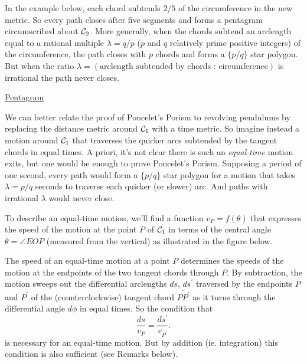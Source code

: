 \documentclass{ximera}
\begin{document}
In the example below, each chord subtends $2/5$ of the circumference in the new metric. So every path closes after five segments and forms a pentagram circumscribed about ${\cal C}_2$. More generally, when the chords subtend an arclength equal to a rational multiple $\lambda = q/p$ ($p$ and $q$ relatively prime positive integers) of the circumference, the path closes with $p$ chords and forms a $\{p/q \}$ star polygon. But when the ratio $\lambda = (\text{arclength subtended by chords : circumference})$ is irrational the path never closes.

\begin{exploration}
\begin{onlineOnly}
    \begin{center}
\end{center}
\end{onlineOnly}

\href{https://www.desmos.com/calculator/qco4rghhfi}{Pentagram}

\end{exploration}

We can better relate the proof of Poncelet's Porism to revolving pendulums by replacing the distance metric around ${\cal C}_1$ with a time metric. So imagine instead a motion around ${\cal C}_1$ that traverses the quicker arcs subtended by the tangent chords in equal times. A priori, it's not clear there is such an \emph{equal-time} motion exits, but one would be enough to prove Poncelet's Porism. Supposing a period of one second, every path would form a $\{p/q \}$ star polygon for a motion that takes $\lambda = p/q$ seconds to traverse each quicker (or slower) arc. And paths with irrational $\lambda$ would never close. 


To describe an equal-time motion, we'll find a function $v_P = f(\theta)$ that expresses the speed of the motion at the point $P$ of ${\cal C}_1$ in terms of the central angle $\theta = \angle EOP$ (measured from the vertical) as illustrated in the figure below.

\begin{exploration}  \label{Exp:4534888989}
\begin{onlineOnly}
    \begin{center}
\end{center}
\end{onlineOnly}
\end{exploration}

The speed of an equal-time motion at a point $P$ determines the speeds of the motion at the endpoints of the two tangent chords through $P$. By subtraction, the motion sweeps out the differential arclengths $ds$, $ds^\prime$ traversed by the endpoints $P$ and $P^\prime$ of the (counterclockwise) tangent chord $\overline{PP^\prime}$ as it turns through the differential angle $d\phi$ in equal times.   So the condition that 
\begin{equation}
  \frac{ds}{v_P} = \frac{ds^\prime}{v_{P^\prime}}.   \label{Eq:EqualTime5}
\end{equation}
is necessary for an equal-time motion. But by addition (ie. integration) this condition is also sufficient (see Remarks below).
\end{document}
